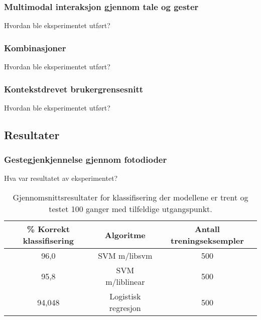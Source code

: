 \subsubsection{Multimodal interaksjon gjennom tale og gester}
{\color{red}Hvordan ble eksperimentet utført?}

\subsubsection{Kombinasjoner}
{\color{red}Hvordan ble eksperimentet utført?}

\subsubsection{Kontekstdrevet brukergrensesnitt}
{\color{red}Hvordan ble eksperimentet utført?}





\subsection{Resultater}
\subsubsection{Gestegjenkjennelse gjennom fotodioder}
{\color{red}Hva var resultatet av eksperimentet?}
\label{ch:2.resultater}
\begin{table}[h!]
\centering
\begin{tabular}{|| c c c ||}
\hline
\% Korrekt klassifisering & Algoritme & Antall treningseksempler\\ [0.5ex] 
 \hline\hline
 96,0 & SVM m/libsvm & 500 \\ 
 \hline
 95,8 & SVM m/liblinear & 500 \\
 \hline
 94,048 & Logistisk regresjon & 500 \\ [1ex]
 \hline
\end{tabular}
\caption{Gjennomsnittsresultater for klassifisering der modellene er trent og testet 100 ganger med tilfeldige utgangspunkt.}
\label{table:results}
\end{table}

